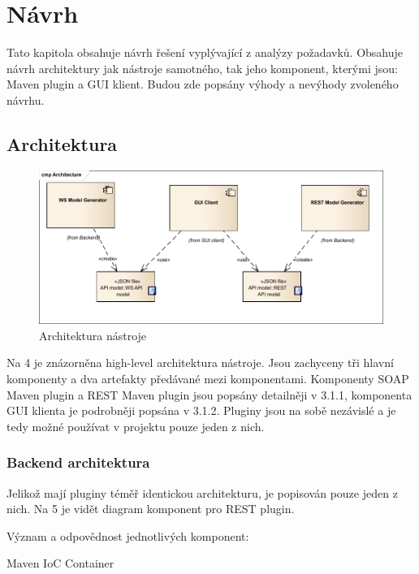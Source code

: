\documentclass[11pt,twoside,a4paper]{book}
\begin{document}
\chapter{Návrh}

Tato kapitola obsahuje návrh řešení vyplývající z analýzy požadavků. Obsahuje návrh
architektury jak nástroje samotného, tak jeho komponent, kterými jsou: Maven plugin a GUI
klient. Budou zde popsány výhody a nevýhody zvoleného návrhu.

\section{Architektura}

\begin{figure}[h]
\begin{center}
\includegraphics[width=13cm]{images-pdf/Architecture.pdf}
\caption{Architektura nástroje}
\label{fig:logo}
\end{center}
\end{figure}

Na 4 je znázorněna high-level architektura nástroje. Jsou zachyceny tři hlavní komponenty a
dva artefakty předávané mezi komponentami. Komponenty SOAP Maven plugin a REST
Maven plugin jsou popsány detailněji v 3.1.1, komponenta GUI klienta je podrobněji popsána
v 3.1.2. Pluginy jsou na sobě nezávislé a je tedy možné používat v projektu pouze jeden z
nich.

\subsection{Backend architektura}

Jelikož mají pluginy téměř identickou architekturu, je popisován pouze jeden z nich. Na 5 je
vidět diagram komponent pro REST plugin.

Význam a odpovědnost jednotlivých komponent:

Maven IoC Container
\end{document}
